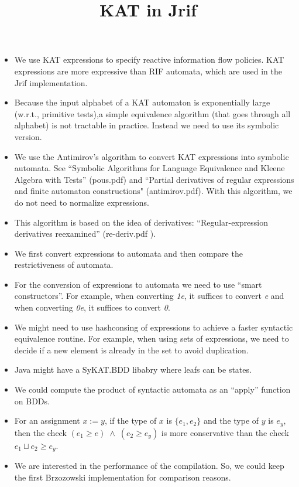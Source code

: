 \documentclass[10pt]{article}
\title{KAT in Jrif}
\begin{document}
\maketitle
\begin{itemize}
\item We use KAT expressions to specify reactive information flow policies. KAT expressions are more expressive than RIF automata, which are used in the Jrif implementation.
\item Because the input alphabet of a KAT automaton is exponentially large (w.r.t., primitive tests),a simple equivalence algorithm (that goes through all alphabet) is not tractable in practice. Instead we need to use its symbolic version.
\item We use the Antimirov's algorithm to convert KAT expressions into symbolic automata. See ``Symbolic Algorithms for Language Equivalence and Kleene Algebra with Tests'' (pous.pdf) and ``Partial derivatives of regular expressions and finite automaton constructions" (antimirov.pdf). With this algorithm, we do not need to normalize expressions.
\item This algorithm is based on the idea of derivatives: ``Regular-expression derivatives reexamined'' (re-deriv.pdf
).
\item We first convert expressions to automata and then compare the restrictiveness of automata.
\item For the conversion of expressions to automata we need to use ``smart constructors''. For example, when converting \emph{1e}, it suffices to convert \emph{e} and when converting \emph{0e}, it suffices to convert \emph{0}.
\item We might need to use hashconsing of expressions to achieve a faster syntactic equivalence routine. For example, when using sets of expressions, we need to decide if a new element is already in the set to avoid duplication.
\item Java might have a SyKAT.BDD libabry where leafs can be states.
\item We could compute the product of syntactic automata as an ``apply'' function on BDDs.
\item For an assignment $x:=y$, if the type of $x$ is $\{e_1,e_2\}$ and the type of $y$ is $e_y$, then the check $(e_1\geq e)\;\wedge\;(e_2\geq e_y)$ is more conservative than the check $e_1\sqcup e_2\geq e_y$.
\item We are interested in the performance of the compilation. So, we could keep the first Brzozowski implementation for comparison reasons.
\end{itemize}
\end{document}

